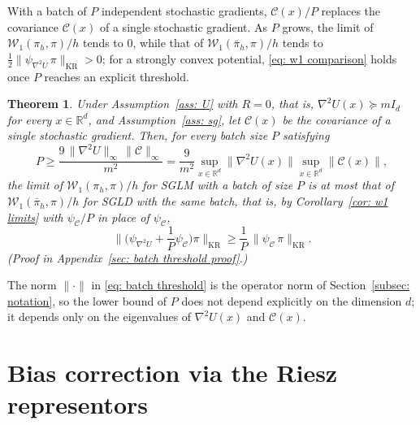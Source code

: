 \documentclass{article}
\newtheorem{theorem}{Theorem}
\newcommand{\Ge}{\geqslant}
\newcommand{\norm}[1]{\lVert #1 \rVert}
\numberwithin{equation}{section}
\begin{document}
With a batch of $P$ independent stochastic gradients, $\mathcal C(x)/P$ replaces the covariance $\mathcal C(x)$ of a single stochastic gradient. As $P$ grows, the limit of $\mathcal W_1(\pi_h, \pi)/h$ tends to $0$, while that of $\mathcal W_1(\bar\pi_h, \pi)/h$ tends to $\frac12 \norm{\psi_{\nabla^2 U}\, \pi}_{\mathrm{KR}} > 0$; for a strongly convex potential, \eqref{eq: w1 comparison} holds once $P$ reaches an explicit threshold.

\begin{theorem}
\label{thm: batch threshold}
    Under Assumption~\ref{ass: U} with $R = 0$, that is, $\nabla^2 U(x) \succeq m I_d$ for every $x \in \mathbb R^d$, and Assumption~\ref{ass: sg}, let $\mathcal C(x)$ be the covariance of a single stochastic gradient. Then, for every batch size $P$ satisfying
    \begin{equation}
        P \Ge \frac{9\, \norm{\nabla^2 U}_\infty\, \norm{\mathcal C}_\infty}{m^2} = \frac{9}{m^2} \sup_{x\in\mathbb R^d} \norm{\nabla^2U(x)} \sup_{x\in\mathbb R^d} \norm{\mathcal C(x)},
        \label{eq: batch threshold}
    \end{equation}
    the limit of $\mathcal W_1(\pi_h, \pi)/h$ for SGLM with a batch of size $P$ is at most that of $\mathcal W_1(\bar\pi_h, \pi)/h$ for SGLD with the same batch, that is, by Corollary~\ref{cor: w1 limits} with $\psi_{\mathcal C}/P$ in place of $\psi_{\mathcal C}$,
    \begin{equation}
        \Big\|\Big( \psi_{\nabla^2 U} + \frac1P\psi_{\mathcal C} \Big) \pi\Big\|_{\mathrm{KR}} \Ge \frac1P\, \norm{\psi_{\mathcal C}\, \pi}_{\mathrm{KR}} .
        \label{eq: w1 comparison batch}
    \end{equation}
    \emph{(Proof in Appendix~\ref{sec: batch threshold proof}.)}
\end{theorem}

The norm $\norm{\cdot}$ in \eqref{eq: batch threshold} is the operator norm of Section~\ref{subsec: notation}, so the lower bound of $P$ does not depend explicitly on the dimension $d$; it depends only on the eigenvalues of $\nabla^2 U(x)$ and $\mathcal C(x)$.

\section{Bias correction via the Riesz representors}
\label{sec: representors}
\end{document}
